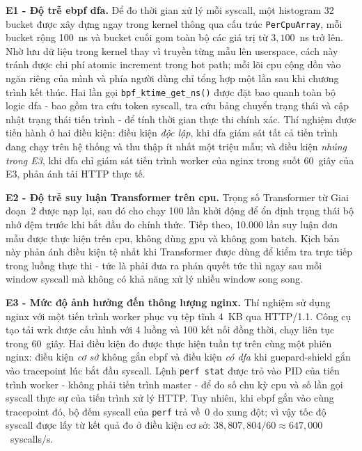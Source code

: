 \documentclass[../main.tex]{subfiles}
\begin{document}
\textbf{E1 - Độ trễ \gls{ebpf} \gls{dfa}.}
Để đo thời gian xử lý mỗi \gls{syscall}, một histogram 32 bucket được xây
dựng ngay trong kernel thông qua cấu trúc \texttt{PerCpuArray}, mỗi
bucket rộng 100~ns và bucket cuối gom toàn bộ các giá trị từ
$3{,}100$~ns trở lên. Nhờ lưu dữ liệu trong kernel thay vì truyền từng
mẫu lên userspace, cách này tránh được chi phí atomic increment trong
hot path; mỗi lõi \gls{cpu} cộng dồn vào ngăn riêng của mình và phía
người dùng chỉ tổng hợp một lần sau khi chương trình kết thúc. Hai lần gọi
\texttt{bpf\_ktime\_get\_ns()} được đặt bao quanh toàn bộ logic \gls{dfa} -
bao gồm tra cứu token \gls{syscall}, tra cứu bảng chuyển trạng thái và cập
nhật trạng thái tiến trình - để tính thời gian thực thi chính xác. Thí
nghiệm được tiến hành ở hai điều kiện: điều kiện \emph{độc lập}, khi
\gls{dfa} giám sát tất cả tiến trình đang chạy trên hệ thống và thu thập ít
nhất một triệu mẫu; và điều kiện \emph{nhúng trong E3}, khi \gls{dfa} chỉ
giám sát tiến trình worker của nginx trong suốt 60~giây của E3, phản
ánh tải HTTP thực tế.

\textbf{E2 - Độ trễ suy luận Transformer trên \gls{cpu}.}
Trọng số Transformer từ Giai đoạn~2 được nạp lại, sau đó cho chạy 100
lần khởi động để ổn định trạng thái bộ nhớ đệm trước khi bắt đầu đo
chính thức. Tiếp theo, 10.000 lần suy luận đơn mẫu được thực hiện trên
\gls{cpu}, không dùng \gls{gpu} và không gom batch. Kịch bản này phản ánh điều kiện
tệ nhất khi Transformer được dùng để kiểm tra trực tiếp trong luồng
thực thi - tức là phải đưa ra phán quyết tức thì ngay sau mỗi window
\gls{syscall} mà không có khả năng xử lý nhiều window song song.

\textbf{E3 - Mức độ ảnh hưởng đến thông lượng nginx.}
Thí nghiệm sử dụng nginx với một tiến trình worker phục vụ tệp tĩnh
4~KB qua HTTP/1.1. Công cụ tạo tải wrk được cấu hình với 4 luồng và
100 kết nối đồng thời, chạy liên tục trong 60~giây. Hai điều kiện đo
được thực hiện tuần tự trên cùng một phiên nginx: điều kiện \emph{cơ
sở} không gắn \gls{ebpf} và điều kiện \emph{có \gls{dfa}} khi guepard-shield gắn
vào tracepoint lúc bắt đầu \gls{syscall}. Lệnh \texttt{perf~stat} được trỏ
vào PID của tiến trình worker - không phải tiến trình master - để đo số
chu kỳ \gls{cpu} và số lần gọi \gls{syscall} thực sự của tiến trình xử lý HTTP.
Tuy nhiên, khi \gls{ebpf} gắn vào cùng tracepoint đó, bộ đếm \gls{syscall} của
\texttt{perf} trả về~0 do xung đột; vì vậy tốc độ \gls{syscall} được lấy từ
kết quả đo ở điều kiện cơ sở:
$38{,}807{,}804 / 60 \approx 647{,}000$~syscalls/s.
\end{document}
